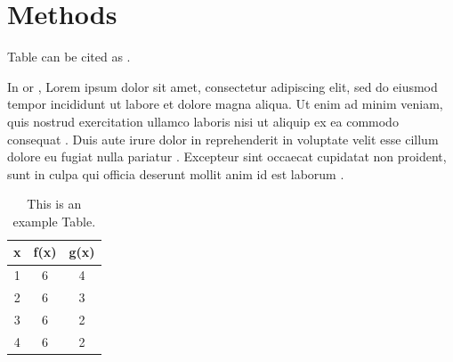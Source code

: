 \chapter{Methods}
\label{chap:methods}

Table can be cited as .

In  or , 
Lorem ipsum dolor sit amet, consectetur adipiscing elit, sed do eiusmod tempor incididunt ut labore et dolore magna aliqua. Ut enim ad minim veniam, quis nostrud exercitation ullamco laboris nisi ut aliquip ex ea commodo consequat \cite{ref1}. Duis aute irure dolor in reprehenderit in voluptate velit esse cillum dolore eu fugiat nulla pariatur \cite{ref2}. Excepteur sint occaecat cupidatat non proident, sunt in culpa qui officia deserunt mollit anim id est laborum \cite{ref3}.

\begin{table}
	\centering
	
	\begin{tabular}{ccc}
	\toprule
	x & f(x) & g(x) \\
	\midrule
	1 & 6 & 4  \\
	2 & 6 & 3  \\
	3 & 6 & 2  \\
	4 & 6 & 2  \\
	\bottomrule

	\end{tabular}
	\caption{This is an example Table.}
	\label{tab:chap-2}
	\clearpage
\end{table}



